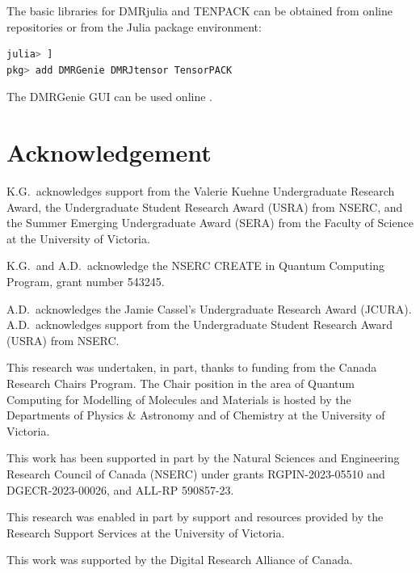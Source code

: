 \documentclass{juliacon}
\begin{document}
The basic libraries for DMRjulia and TENPACK can be obtained from online repositories \cite{dmrjulia,tenpack} or from the Julia package environment:
\begin{lstlisting}[language = Julia]
julia> ]
pkg> add DMRGenie DMRJtensor TensorPACK
\end{lstlisting}

The DMRGenie GUI can be used online \cite{dmrgenie}.

\section{Acknowledgement}

K.G.~acknowledges support from the Valerie Kuehne Undergraduate Research Award, the Undergraduate Student Research Award (USRA) from NSERC, and the Summer Emerging Undergraduate Award (SERA) from the Faculty of Science at the University of Victoria. 

K.G.~and A.D.~acknowledge the NSERC CREATE in Quantum Computing Program, grant number 543245.

A.D.~acknowledges the Jamie Cassel's Undergraduate Research Award (JCURA). A.D.~acknowledges support from the Undergraduate Student Research Award (USRA) from NSERC.

This research was undertaken, in part, thanks to funding from the Canada Research Chairs Program. The Chair position in the area of Quantum Computing for Modelling of Molecules and Materials is hosted by the Departments of Physics \& Astronomy and of Chemistry at the University of Victoria. 

This work has been supported in part by the Natural Sciences and Engineering Research Council of Canada (NSERC) under grants RGPIN-2023-05510 and DGECR-2023-00026, and ALL-RP 590857-23.

This research was enabled in part by support and resources provided by the Research Support Services at the University of Victoria.

This work was supported by the Digital Research Alliance of Canada.



\end{document}
